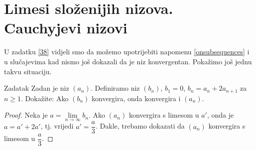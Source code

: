 \section{Limesi složenijih nizova. Cauchyjevi nizovi}
U zadatku \ref{38} vidjeli smo da možemo upotrijebiti napomenu \ref{onsubsequences} i u slučajevima kad nismo još dokazali da je niz konvergentan. Pokažimo još jednu takvu situaciju.
\begin{exercise}{Zadatak}
\label{iteration}
Zadan je niz \((a_n)\). Definiramo niz \((b_n)\), \(b_1=0\), \(b_n=a_{n}+2a_{n+1}\) za \(n\geq 1\). Dokažite: Ako \((b_n)\) konvergira, onda konvergira i \((a_n)\).
\end{exercise}
\begin{proof}
Neka je \(a=\lim\limits_{n\to \infty}{b_n}\). Ako \((a_n)\) konvergira s limesom u \(a'\), onda je \(a=a'+2a'\), tj. vrijedi \(a'=\dfrac{a}{3}\). Dakle, trebamo dokazati da \((a_n)\) konvergira s limesom u \(\dfrac{a}{3}\).


\end{proof}
